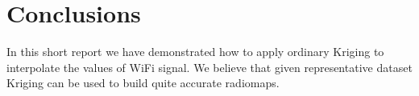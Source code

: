 \section{Conclusions}
\label{section:conclusion}

In this short report we have demonstrated how to apply ordinary Kriging to 
interpolate the values of WiFi signal. We believe that given representative dataset Kriging
can be used to build quite accurate radiomaps.
